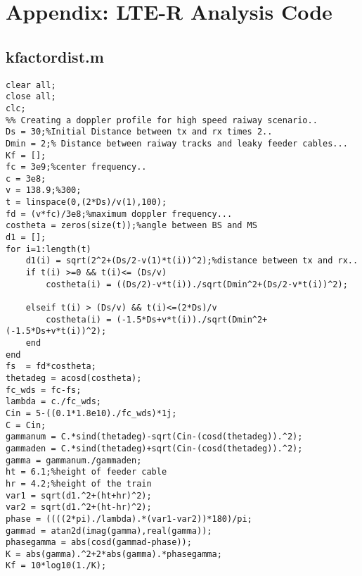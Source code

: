 \chapter{Appendix: LTE-R Analysis Code}
\section{kfactordist.m}
\begin{lstlisting}[breaklines]
% Calculating K-factor for the tunnel environment for HST
clear all;
close all;
clc;
%% Creating a doppler profile for high speed raiway scenario..
Ds = 30;%Initial Distance between tx and rx times 2..
Dmin = 2;% Distance between raiway tracks and leaky feeder cables...
Kf = [];
fc = 3e9;%center frequency..
c = 3e8;
v = 138.9;%300;
t = linspace(0,(2*Ds)/v(1),100);
fd = (v*fc)/3e8;%maximum doppler frequency...
costheta = zeros(size(t));%angle between BS and MS
d1 = [];
for i=1:length(t)
    d1(i) = sqrt(2^2+(Ds/2-v(1)*t(i))^2);%distance between tx and rx..
    if t(i) >=0 && t(i)<= (Ds/v)
        costheta(i) = ((Ds/2)-v*t(i))./sqrt(Dmin^2+(Ds/2-v*t(i))^2);
    
    elseif t(i) > (Ds/v) && t(i)<=(2*Ds)/v
        costheta(i) = (-1.5*Ds+v*t(i))./sqrt(Dmin^2+(-1.5*Ds+v*t(i))^2);
    end  
end
fs  = fd*costheta;
thetadeg = acosd(costheta);
fc_wds = fc-fs;
lambda = c./fc_wds;
Cin = 5-((0.1*1.8e10)./fc_wds)*1j;
C = Cin;
gammanum = C.*sind(thetadeg)-sqrt(Cin-(cosd(thetadeg)).^2);
gammaden = C.*sind(thetadeg)+sqrt(Cin-(cosd(thetadeg)).^2);
gamma = gammanum./gammaden;
ht = 6.1;%height of feeder cable
hr = 4.2;%height of the train
var1 = sqrt(d1.^2+(ht+hr)^2);
var2 = sqrt(d1.^2+(ht-hr)^2);
phase = ((((2*pi)./lambda).*(var1-var2))*180)/pi;
gammad = atan2d(imag(gamma),real(gamma));
phasegamma = abs(cosd(gammad-phase));
K = abs(gamma).^2+2*abs(gamma).*phasegamma;
Kf = 10*log10(1./K);
\end{lstlisting}

